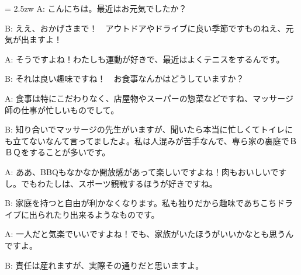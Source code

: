 \documentclass[11pt]{amsart}
\title{}
\author{}
\newenvironment{hangall}[1]{\hangindent = 2.5zw\everypar{\hangindent = 2.5zw}}{}
\begin{document}
\maketitle
\begin{hangall}{}%
A: こんにちは。最近はお元気でしたか？



B: ええ、おかげさまで！　アウトドアやドライブに良い季節ですものねえ、元気が出ますよ！



A: そうですよね！わたしも運動が好きで、最近はよくテニスをするんです。



B: それは良い趣味ですね！　お食事なんかはどうしていますか？



A: 食事は特にこだわりなく、店屋物やスーパーの惣菜などですね、マッサージ師の仕事が忙しいものでして。



B: 知り合いでマッサージの先生がいますが、聞いたら本当に忙しくてトイレにも立てないなんて言ってましたよ。私は人混みが苦手なんで、専ら家の裏庭でＢＢＱをすることが多いです。



A: ああ、BBQもなかなか開放感があって楽しいですよね！肉もおいしいですし。でもわたしは、スポーツ観戦するほうが好きですね。



B: 家庭を持つと自由が利かなくなります。私も独りだから趣味であちこちドライブに出られたり出来るようなものです。



A: 一人だと気楽でいいですよね！でも、家族がいたほうがいいかなとも思うんですよ。



B: 責任は産れますが、実際その通りだと思いますよ。\end{hangall}
\end{document}
